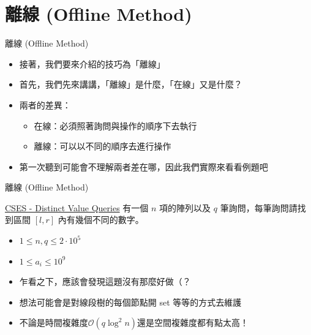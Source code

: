 \documentclass[aspectratio=169]{beamer}
\begin{document}
    \section{離線 (Offline Method)}
    
    \begin{frame}{離線 (Offline Method)}
        \begin{itemize}
            \item 接著，我們要來介紹的技巧為「離線」
            \item 首先，我們先來講講，「離線」是什麼，「在線」又是什麼？
            \item<2-> 兩者的差異：
            \begin{itemize}
                \item 在線：必須照著詢問與操作的順序下去執行
                \item 離線：可以以不同的順序去進行操作
            \end{itemize}
            \item<3-> 第一次聽到可能會不理解兩者差在哪，因此我們實際來看看例題吧
        \end{itemize}
    \end{frame}

    \begin{frame}{離線 (Offline Method)}
        \begin{block}{\href{https://cses.fi/problemset/task/1734/}{CSES - Distinct Value Queries}}
            有一個 $n$ 項的陣列以及 $q$ 筆詢問，每筆詢問請找到區間 $[l,r]$ 內有幾個不同的數字。 \\
            \vspace{0.5cm}
            \begin{itemize}
                \item $1 \le n,q \le 2 \cdot 10^5$
                \item $1 \le a_i \le 10^9$
            \end{itemize}
        \end{block}
        \begin{itemize}
            \item<2-> 乍看之下，應該會發現這題沒有那麼好做（？
            \item<2-> 想法可能會是對線段樹的每個節點開 set 等等的方式去維護
            \item<3-> 不論是時間複雜度$\mathcal{O}(q \log^2 n)$還是空間複雜度都有點太高！
        \end{itemize}
    \end{frame}
\end{document}
